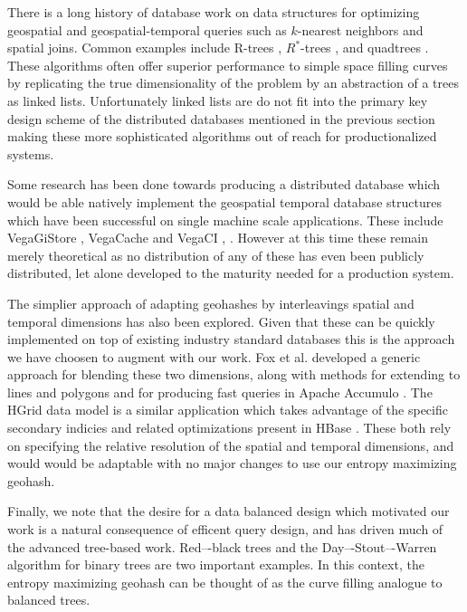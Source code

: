 \documentclass[nips13submit_09,times,art10]{article} %
\begin{document}
There is a long history of database work on data structures for
optimizing geospatial and geospatial-temporal queries such
as $k$-nearest neighbors and spatial joins. Common examples
include R-trees \cite{guttman1984r},
$R^{*}$-trees \cite{beckmann1990r}, and quadtrees \cite{samet1985storing}.
These algorithms often offer superior performance to simple space filling
curves by replicating the true dimensionality of the problem by an abstraction
of a trees as linked lists. Unfortunately linked lists are do not fit into
the primary key design scheme of the distributed databases mentioned in
the previous section making these more sophisticated algorithms out of
reach for productionalized systems.

Some research has been done towards producing a distributed database which would
be able natively implement the geospatial temporal database structures which have been successful
on single machine scale applications. These include VegaGiStore \cite{zhong2012towards},
VegaCache \cite{zhong2013vegacache} and VegaCI \cite{zhong2012distributed}, \cite{zhong2012elastic}.
However at this time these remain merely theoretical as no distribution of any of these
has even been publicly distributed, let alone developed to the maturity needed for a
production system.

The simplier approach of adapting geohashes by interleavings spatial and temporal dimensions
has also been explored. Given that these can be quickly implemented on top of existing industry
standard databases this is the approach we have choosen to augment with our work. Fox et al.
developed a generic approach for blending these two dimensions, along with methods for
extending to lines and polygons and for producing fast queries in Apache Accumulo \cite{fox2013spatio}.
The HGrid data model is a similar application which takes advantage of the specific secondary
indicies and related optimizations present in HBase \cite{han2013hgrid}. These both rely on
specifying the relative resolution of the spatial and temporal dimensions, and would would be
adaptable with no major changes to use our entropy maximizing geohash.

Finally, we note that the desire for a data balanced design which motivated our work is a
natural consequence of efficent query design, and has driven much of the advanced tree-based
work. Red–-black trees \cite{bayer1972symmetric} and the Day–-Stout–-Warren algorithm
for binary trees \cite{stout1986tree} are two important examples. In this context, the
entropy maximizing geohash can be thought of as the curve filling analogue to balanced trees.
\end{document}
